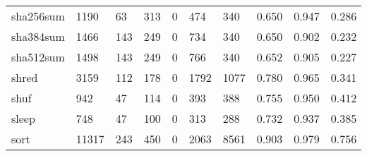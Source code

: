 \begin{longtable}{lp{2.0cm}p{2.0cm}p{2.0cm}p{2.0cm}p{2.0cm}p{2.0cm}p{2.0cm}p{2.0cm}p{2.0cm}}
sha256sum &                   1190 &                                 63 &                               313 &                                0 &                               474 &                             340 &                                0.650 &                                  0.947 &                                0.286 \\
sha384sum &                   1466 &                                143 &                               249 &                                0 &                               734 &                             340 &                                0.650 &                                  0.902 &                                0.232 \\
sha512sum &                   1498 &                                143 &                               249 &                                0 &                               766 &                             340 &                                0.652 &                                  0.905 &                                0.227 \\
shred     &                   3159 &                                112 &                               178 &                                0 &                              1792 &                            1077 &                                0.780 &                                  0.965 &                                0.341 \\
shuf      &                    942 &                                 47 &                               114 &                                0 &                               393 &                             388 &                                0.755 &                                  0.950 &                                0.412 \\
sleep     &                    748 &                                 47 &                               100 &                                0 &                               313 &                             288 &                                0.732 &                                  0.937 &                                0.385 \\
sort      &                  11317 &                                243 &                               450 &                                0 &                              2063 &                            8561 &                                0.903 &                                  0.979 &                                0.756 \\

\end{longtable}
